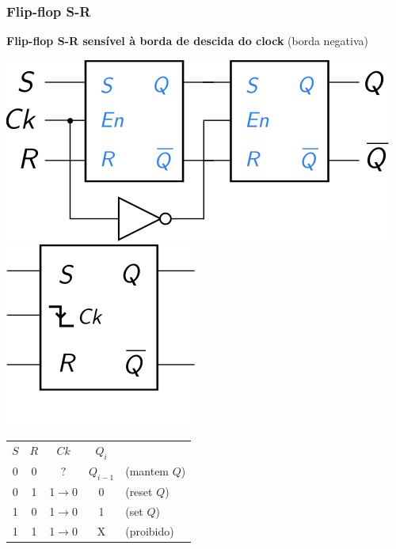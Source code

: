\documentclass{beamer}
\begin{document}
\begin{frame}
\frametitle{Flip-flop S-R}

\textbf{Flip-flop S-R sensível à borda de descida do clock} (borda negativa)

\begin{center}
\includegraphics{images/flipflopRS_circuit}
\hspace{2ex}\pause
\raisebox{50pt}{\Huge$=$}\pause
\hspace{2ex}
\includegraphics{images/flipflopRS_blackbox}

\pause

\vspace{12pt}

\begin{tabular}{ccc||cl}
$S$ & $R$ &        $Ck$       & $Q_i$ \\
\cline{1-4}
 0  &  0  &        $?$        & $Q_{i-1}$  & (mantem $Q$) \\
 0  &  1  &  1$\rightarrow$0  &     0      & (reset $Q$) \\
 1  &  0  &  1$\rightarrow$0  &     1      & (set $Q$) \\
 1  &  1  &  1$\rightarrow$0  &     X  & (proibido) \\
\end{tabular}
\end{center}

\end{frame}
\end{document}
